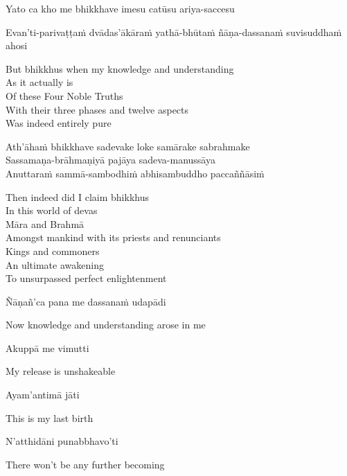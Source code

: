 Yato ca kho me bhikkhave imesu catūsu ariya-saccesu\\
\begin{pali-hang}
  Evan'ti-parivaṭṭaṁ dvādas'ākāraṁ yathā-bhūtaṁ ñāṇa-dassanaṁ suvisuddhaṁ ahosi
\end{pali-hang}

\begin{english-verses}
  But bhikkhus when my knowledge and understanding\\
  As it actually is\\
  Of these Four Noble Truths\\
  With their three phases and twelve aspects\\
  Was indeed entirely pure
\end{english-verses}

Ath'āhaṁ bhikkhave sadevake loke samārake sabrahmake\\
Sassamaṇa-brāhmaṇiyā pajāya sadeva-manussāya\\
Anuttaraṁ sammā-sambodhiṁ abhisambuddho paccaññāsiṁ

\begin{english-verses}
  Then indeed did I claim bhikkhus\\
  In this world of devas\\
  Māra and Brahmā\\
  Amongst mankind with its priests and renunciants\\
  Kings and commoners\\
  An ultimate awakening\\
  To unsurpassed perfect enlightenment
\end{english-verses}

Ñāṇañ'ca pana me dassanaṁ udapādi

\begin{english}
  Now knowledge and understanding arose in me
\end{english}

Akuppā me vimutti

\begin{english}
  My release is unshakeable
\end{english}

Ayam'antimā jāti

\begin{english}
  This is my last birth
\end{english}

N'atthidāni punabbhavo'ti

\begin{english}
  There won't be any further becoming
\end{english}

